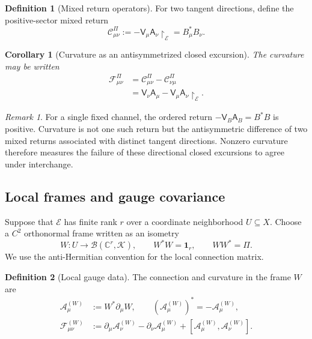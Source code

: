 \documentclass[11pt,reqno]{scrartcl}
\newcommand{\CC}{\mathbb C}
\newcommand{\scrK}{\mathscr K}
\newcommand{\idop}{\mathbf 1}
\newcommand{\Aop}{\mathsf A}
\newcommand{\Vop}{\mathsf V}
\newcommand{\restr}[2]{#1\!\upharpoonright_{#2}}
\newcommand{\gaugeA}{\mathcal A}
\newcommand{\gaugeF}{\mathcal F}
\theoremstyle{plain}
\newtheorem{corollary}[corollary]{Corollary}
\theoremstyle{definition}
\newtheorem{definition}[definition]{Definition}
\theoremstyle{remark}
\newtheorem{remark}[remark]{Remark}
\begin{document}
\begin{definition}[Mixed return operators]
\label{def:mixed-return}
For two tangent directions, define the positive-sector mixed return
\begin{equation}
  \mathscr C_{\mu\nu}^{\Pi}
  :=-\restr{\Vop_\mu\Aop_\nu}{\mathscr E}
  =B_\mu^*B_\nu.
  \label{eq:mixed-return}
\end{equation}
\end{definition}

\begin{corollary}[Curvature as an antisymmetrized closed excursion]
\label{cor:curvature-AV}
The curvature may be written
\begin{align}
  \gaugeF_{\mu\nu}^{\Pi}
  &=\mathscr C_{\mu\nu}^{\Pi}-\mathscr C_{\nu\mu}^{\Pi}
  \label{eq:curvature-mixed-return}\\
  &=\restr{\Vop_\nu\Aop_\mu-\Vop_\mu\Aop_\nu}{\mathscr E}.
  \label{eq:curvature-AV}
\end{align}
\end{corollary}

\begin{remark}
For a single fixed channel, the ordered return
\(-\Vop_B\Aop_B=B^*B\) is positive.  Curvature is not one such return but
the antisymmetric difference of two mixed returns associated with distinct
tangent directions.  Nonzero curvature therefore measures the failure of
these directional closed excursions to agree under interchange.
\end{remark}

\subsection{Local frames and gauge covariance}

Suppose that \(\mathscr E\) has finite rank \(r\) over a coordinate
neighborhood \(U\subseteq X\).  Choose a \(C^2\) orthonormal frame written as
an isometry
\begin{equation}
  W:U\longrightarrow\mathcal B(\CC^r,\scrK),
  \qquad
  W^*W=\idop_r,
  \qquad
  WW^*=\Pi.
  \label{eq:local-frame}
\end{equation}
We use the anti-Hermitian convention for the local connection matrix.

\begin{definition}[Local gauge data]
\label{def:local-gauge-data}
The connection and curvature in the frame \(W\) are
\begin{align}
  \gaugeA_\mu^{(W)}&:=W^*\partial_\mu W,
  \qquad
  (\gaugeA_\mu^{(W)})^*=-\gaugeA_\mu^{(W)},
  \label{eq:local-connection}\\
  \gaugeF_{\mu\nu}^{(W)}
  &:=\partial_\mu\gaugeA_\nu^{(W)}
    -\partial_\nu\gaugeA_\mu^{(W)}
    +[\gaugeA_\mu^{(W)},\gaugeA_\nu^{(W)}].
  \label{eq:local-curvature}
\end{align}
\end{definition}
\end{document}
